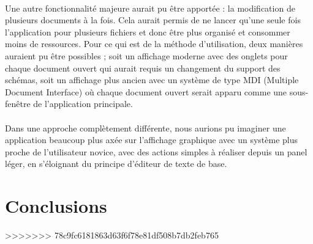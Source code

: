 \paragraph{}

Une autre fonctionnalité majeure aurait pu être apportée : la modification de plusieurs documents à la fois. Cela aurait permis de ne lancer qu'une seule fois l'application pour plusieurs fichiers et donc être plus organisé et consommer moins de ressources. Pour ce qui est de la méthode d'utilisation, deux manières auraient pu être possibles ; soit un affichage moderne avec des onglets pour chaque document ouvert qui aurait requis un changement du support des schémas, soit un affichage plus ancien avec un système de type MDI (Multiple Document Interface) où chaque document ouvert serait apparu comme une sous-fenêtre de l'application principale.
\paragraph{}

Dans une approche complètement différente, nous aurions pu imaginer une application beaucoup plus axée sur l'affichage graphique avec un système plus proche de l'utilisateur novice, avec des actions simples à réaliser depuis un panel léger, en s'éloignant du principe d'éditeur de texte de base.

	\section{Conclusions}
>>>>>>> 78c9fc6181863d63f6f78e81df508b7db2feb765
